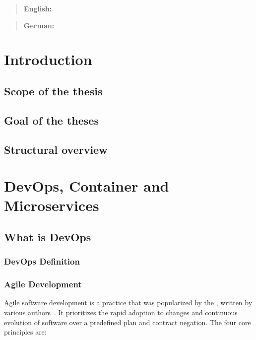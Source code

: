 \documentclass[12pt, a4paper]{article}
\begin{document}


\tableofcontents
{}
\setcounter{lastroman}{\value{page}}

\maketitle
\begin{abstract}
    \textbf{English:} \lipsum[20]
\end{abstract}
\begin{abstract}
    \textbf{German:} \lipsum[20]
\end{abstract}
\newpage
\section{ Introduction}
    \subsection{Scope of the thesis}
    \subsection{Goal of the theses}
    \subsection{Structural overview}
    \newpage
\section{DevOps, Container and Microservices}
    \subsection{What is DevOps}
        \subsubsection{DevOps Definition}
        \subsubsection{Agile Development}
        Agile software development is a practice that was popularized by the , written by various authors~\cite{manifesto}. It prioritizes the rapid adoption to changes and continuous evolution of software over a predefined plan and contract negation.
        The four core principles are:
\end{document}
